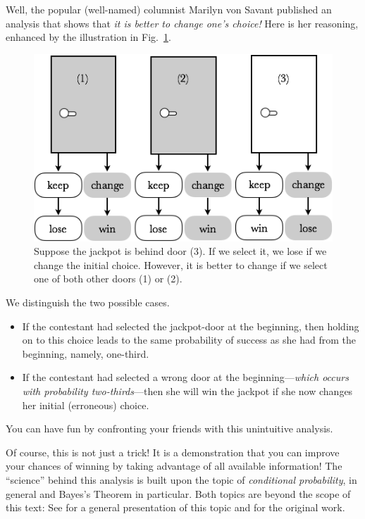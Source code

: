 Well, the popular (well-named) columnist Marilyn von Savant
 published an analysis that shows that
{\em it is better to change one's choice!}  Here is her reasoning,
enhanced by the illustration in Fig.~\ref{fig:MonthyHall-2}.
\begin{figure}[htb]
\begin{center}
        \includegraphics[scale=0.4]{FiguresMaths/MonthyHall}
        \caption{Suppose the jackpot is behind door (3). 
        If we select it, we lose if we change the initial choice.
        However, it is better to change if we select one of both other doors (1) or (2).}
        \label{fig:MonthyHall-2}
\end{center}
\end{figure}
We distinguish the two possible cases.
\begin{itemize}
\item
If the contestant had selected the jackpot-door at the beginning, then
holding on to this choice leads to the same probability of success as
she had from the beginning, namely, one-third.
\item
If the contestant had selected a wrong door at the beginning---{\em which
occurs with probability two-thirds}---then she will win the jackpot if
she now changes her initial (erroneous) choice.
\end{itemize}
You can have fun by confronting your friends with this unintuitive
analysis.

\medskip

Of course, this is not just a trick!  It is a demonstration that you
can improve your chances of winning by taking advantage of all
available information!  The ``science'' behind this analysis is built
upon the topic of {\em conditional probability},
 in general and Bayes's Theorem in
particular.   Both topics are beyond the scope
of this text: See \cite{Lee12} for a general presentation of this
topic and \cite{Bayes} for the original work.


